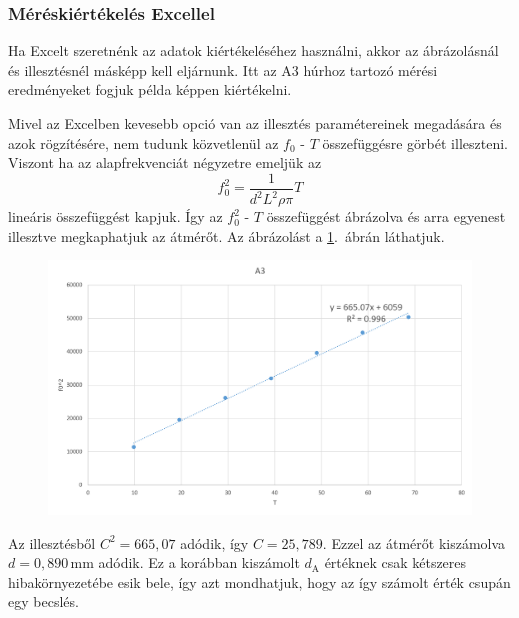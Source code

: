 \documentclass[a4paper,12pt]{article}
\begin{document}
\subsubsection*{Méréskiértékelés Excellel}

Ha Excelt szeretnénk az adatok kiértékeléséhez használni, akkor az ábrázolásnál és illesztésnél másképp kell eljárnunk. Itt az A3 húrhoz tartozó mérési eredményeket fogjuk példa képpen kiértékelni.

Mivel az Excelben kevesebb opció van az illesztés paramétereinek megadására és azok rögzítésére, nem tudunk közvetlenül az $f_0$ - $T$ összefüggésre görbét illeszteni. Viszont ha az alapfrekvenciát négyzetre emeljük az
$$ f_0^2 = \frac{1}{d^2 L^2 \rho \pi} T $$
lineáris összefüggést kapjuk. Így az $f_0^2$ - $T$ összefüggést ábrázolva és arra egyenest illesztve megkaphatjuk az átmérőt. Az ábrázolást a \ref{excel_f2_vs_T}.\ ábrán láthatjuk.

\begin{figure}[h!]
\centering
\includegraphics[width = 14cm]{excel_f2_vs_T.png}
\caption{}
\label{excel_f2_vs_T}
\end{figure}

Az illesztésből $C^2 = 665,07$ adódik, így $C = 25,789$. Ezzel az átmérőt kiszámolva $d = 0,890$\,mm adódik. Ez a korábban kiszámolt $d_\text{A}$ értéknek csak kétszeres hibakörnyezetébe esik bele, így azt mondhatjuk, hogy az így számolt érték csupán egy becslés.





\end{document}
